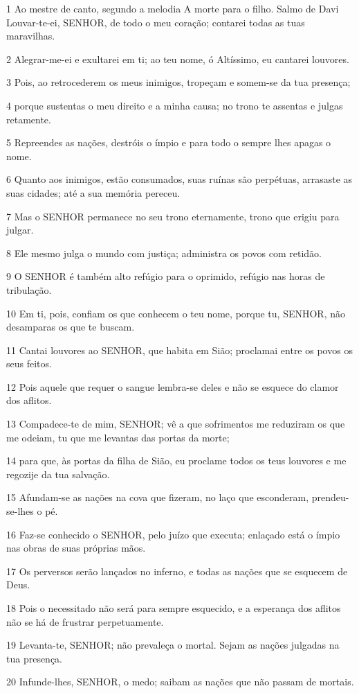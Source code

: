 \par 1 Ao mestre de canto, segundo a melodia A morte para o filho. Salmo de Davi Louvar-te-ei, SENHOR, de todo o meu coração; contarei todas as tuas maravilhas.
\par 2 Alegrar-me-ei e exultarei em ti; ao teu nome, ó Altíssimo, eu cantarei louvores.
\par 3 Pois, ao retrocederem os meus inimigos, tropeçam e somem-se da tua presença;
\par 4 porque sustentas o meu direito e a minha causa; no trono te assentas e julgas retamente.
\par 5 Repreendes as nações, destróis o ímpio e para todo o sempre lhes apagas o nome.
\par 6 Quanto aos inimigos, estão consumados, suas ruínas são perpétuas, arrasaste as suas cidades; até a sua memória pereceu.
\par 7 Mas o SENHOR permanece no seu trono eternamente, trono que erigiu para julgar.
\par 8 Ele mesmo julga o mundo com justiça; administra os povos com retidão.
\par 9 O SENHOR é também alto refúgio para o oprimido, refúgio nas horas de tribulação.
\par 10 Em ti, pois, confiam os que conhecem o teu nome, porque tu, SENHOR, não desamparas os que te buscam.
\par 11 Cantai louvores ao SENHOR, que habita em Sião; proclamai entre os povos os seus feitos.
\par 12 Pois aquele que requer o sangue lembra-se deles e não se esquece do clamor dos aflitos.
\par 13 Compadece-te de mim, SENHOR; vê a que sofrimentos me reduziram os que me odeiam, tu que me levantas das portas da morte;
\par 14 para que, às portas da filha de Sião, eu proclame todos os teus louvores e me regozije da tua salvação.
\par 15 Afundam-se as nações na cova que fizeram, no laço que esconderam, prendeu-se-lhes o pé.
\par 16 Faz-se conhecido o SENHOR, pelo juízo que executa; enlaçado está o ímpio nas obras de suas próprias mãos.
\par 17 Os perversos serão lançados no inferno, e todas as nações que se esquecem de Deus.
\par 18 Pois o necessitado não será para sempre esquecido, e a esperança dos aflitos não se há de frustrar perpetuamente.
\par 19 Levanta-te, SENHOR; não prevaleça o mortal. Sejam as nações julgadas na tua presença.
\par 20 Infunde-lhes, SENHOR, o medo; saibam as nações que não passam de mortais.

